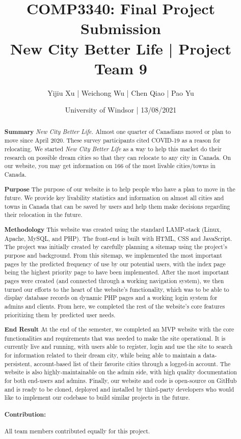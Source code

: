\documentclass[12pt, letterpaper]{article}
\title{COMP3340: Final Project Submission \\{New City Better Life | Project Team 9}}
\author{Yijiu Xu | Weichong Wu | Chen Qiao | Pao Yu}
\date{University of Windsor | 13/08/2021}
\begin{document}
\maketitle

\begin{abstract}

    \textbf{Summary}
    \textit{New City Better Life.} Almost one quarter of Canadians moved or plan to move since April 2020. These survey participants cited COVID-19 as a reason for relocating. We started \textit{New City Better Life} as a way to help this market do their research on possible dream cities so that they can relocate to any city in Canada. On our website, you may get information on 166 of the most livable cities/towns in Canada.
    
    \textbf{Purpose}
    The purpose of our website is to help people who have a plan to move in the future. We provide key livability statistics and information on almost all cities and towns in Canada that can be saved by users and help them make decisions regarding their relocation in the future.
   
    \textbf{Methodology}
    This website was created using the standard LAMP-stack (Linux, Apache, MySQL, and PHP). The front-end is built with HTML, CSS and JavaScript. The project was initially created by carefully planning a sitemap using the project's purpose and background. From this sitemap, we implemented the most important pages by the predicted frequency of use by our potential users, with the index page being the highest priority page to have been implemented. After the most important pages were created (and connected through a working navigation system), we then turned our efforts to the heart of the website's functionality, which was to be able to display database records on dynamic PHP pages and a working login system for admins and clients. From here, we completed the rest of the website's core features prioritizing them by predicted user needs.

    \textbf{End Result}
    At the end of the semester, we completed an MVP website with the core functionalities and requirements that was needed to make the site operational. It is currently live and running, with users able to register, login and use the site to search for information related to their dream city, while being able to maintain a data-persistent, account-based list of their favorite cities through a logged-in account. The website is also highly-maintainable on the admin side, with high quality documentation for both end-users and admins. Finally, our website and code is open-source on GitHub and is ready to be cloned, deployed and installed by third-party developers who would like to implement our codebase to build similar projects in the future.

\paragraph*{Contribution: } All team members contributed equally for this project.

\end{abstract}
\end{document}
